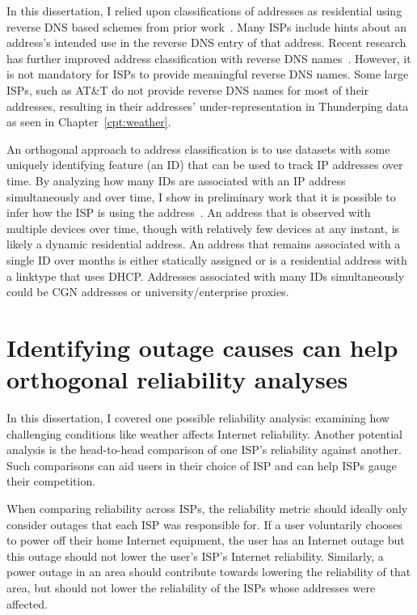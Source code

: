 In this dissertation, I relied upon classifications of addresses as
residential using reverse DNS based schemes from prior
work~\cite{pingin}. Many ISPs include hints about an address's
intended use in
the reverse DNS entry of that address. Recent research has further improved address
classification with reverse DNS names~\cite{youndo-rdns}. However,
it is not mandatory for ISPs to provide meaningful reverse DNS
names. Some large ISPs, such as AT\&T do not provide reverse DNS names
for most of their addresses, resulting in their addresses' under-representation in
Thunderping data as seen in Chapter~\ref{cpt:weather}.

An orthogonal approach to address classification is to use datasets with some uniquely identifying feature (an ID) that can be used to track IP addresses over time. By analyzing how many IDs are associated with an IP address simultaneously and over time, I show in preliminary work that it is possible to infer how the ISP is using the address~\cite{shared-addrs-apnic-blog, shared-addrs-aims}. An address that is observed with multiple devices over time, though with relatively few devices at any instant, is likely a dynamic residential address.  An address that remains associated with a single ID over months is either statically assigned or is a residential address with a linktype that uses DHCP. Addresses associated with many IDs simultaneously could be CGN addresses or university/enterprise proxies.



\section{Identifying outage causes can help orthogonal reliability analyses}

In this dissertation, I covered one possible reliability analysis:
examining how challenging conditions like weather affects Internet
reliability. Another potential analysis is the head-to-head comparison
of one ISP's reliability against another. Such comparisons can aid
users in their choice of ISP and can help ISPs gauge their
competition. 

When comparing reliability across ISPs, the reliability metric
should ideally only consider outages that each ISP was responsible
for. If a user voluntarily chooses to power
off their home Internet equipment, the user has an Internet outage but
this outage should not lower the user's ISP's Internet reliability. Similarly, a power
outage in an area should contribute towards lowering the reliability
of that area, but should not lower the reliability of the
ISPs whose addresses were affected. 

